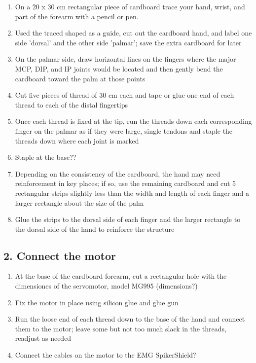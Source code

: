 \documentclass[12pt]{article}
\begin{document}
\vspace{0.2cm}

\begin{enumerate}
\item On a 20 x 30 cm rectangular piece of cardboard trace your hand, wrist, and part of the forearm with a pencil or pen.
\item Used the traced shaped as a guide, cut out the cardboard hand, and label one side 'dorsal' and the other side 'palmar'; save the extra cardboard for later
\item On the palmar side, draw horizontal lines on the fingers where the major MCP, DIP, and IP joints would be located and then gently bend the cardboard toward the palm at those points
\item  Cut five pieces of thread of 30 cm each and tape or glue one end of each thread to each of the distal fingertips
\item Once each thread is fixed at the tip, run the threads down each corresponding finger on the palmar as if they were large, single tendons and staple the threads down where each joint is marked
\item Staple at the base??
\item Depending on the consistency of the cardboard, the hand may need reinforcement in key places; if so, use the remaining cardboard and cut 5 rectangular strips slightly less than the width and length of each finger and a larger rectangle about the size of the palm
\item Glue the strips to the dorsal side of each finger and the larger rectangle to the dorsal side of the hand to reinforce the structure
\end{enumerate}
 
\subsection*{2. Connect the motor}

\begin{enumerate}
\item At the base of the cardboard forearm, cut a rectangular hole with the dimensiones of the servomotor, model MG995 (dimensions?)
\item Fix the motor in place using silicon glue and glue gun
\item Run the loose end of each thread down to the base of the hand and connect them to the motor; leave some but not too much slack in the threads, readjust as needed
\item Connect the cables on the motor to the EMG SpikerShield?
\end{enumerate}
\end{document}
